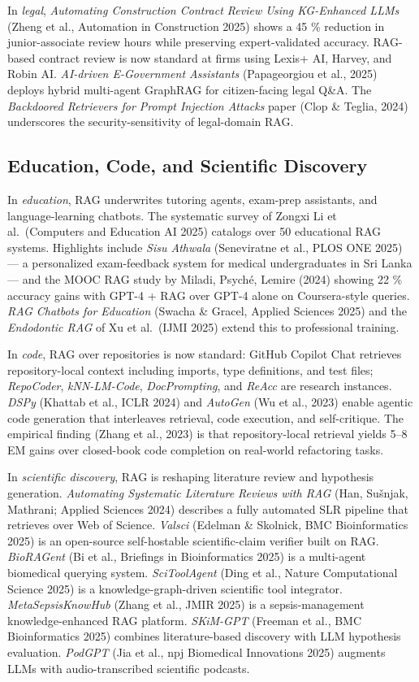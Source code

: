 In \emph{legal}, \emph{Automating Construction Contract Review Using KG-Enhanced LLMs} (Zheng et al., Automation in Construction 2025) shows a 45 \% reduction in junior-associate review hours while preserving expert-validated accuracy. RAG-based contract review is now standard at firms using Lexis+ AI, Harvey, and Robin AI. \emph{AI-driven E-Government Assistants} (Papageorgiou et al., 2025) deploys hybrid multi-agent GraphRAG for citizen-facing legal Q\&A. The \emph{Backdoored Retrievers for Prompt Injection Attacks} paper (Clop \& Teglia, 2024) underscores the security-sensitivity of legal-domain RAG.

\subsection{Education, Code, and Scientific Discovery}\label{education-code-and-scientific-discovery}

In \emph{education}, RAG underwrites tutoring agents, exam-prep assistants, and language-learning chatbots. The systematic survey of Zongxi Li et al.~(Computers and Education AI 2025) catalogs over 50 educational RAG systems. Highlights include \emph{Sisu Athwala} (Seneviratne et al., PLOS ONE 2025) --- a personalized exam-feedback system for medical undergraduates in Sri Lanka --- and the MOOC RAG study by Miladi, Psyché, Lemire (2024) showing 22 \% accuracy gains with GPT-4 + RAG over GPT-4 alone on Coursera-style queries. \emph{RAG Chatbots for Education} (Swacha \& Gracel, Applied Sciences 2025) and the \emph{Endodontic RAG} of Xu et al.~(IJMI 2025) extend this to professional training.

In \emph{code}, RAG over repositories is now standard: GitHub Copilot Chat retrieves repository-local context including imports, type definitions, and test files; \emph{RepoCoder}, \emph{kNN-LM-Code}, \emph{DocPrompting}, and \emph{ReAcc} are research instances. \emph{DSPy} (Khattab et al., ICLR 2024) and \emph{AutoGen} (Wu et al., 2023) enable agentic code generation that interleaves retrieval, code execution, and self-critique. The empirical finding (Zhang et al., 2023) is that repository-local retrieval yields 5--8 EM gains over closed-book code completion on real-world refactoring tasks.

In \emph{scientific discovery}, RAG is reshaping literature review and hypothesis generation. \emph{Automating Systematic Literature Reviews with RAG} (Han, Sušnjak, Mathrani; Applied Sciences 2024) describes a fully automated SLR pipeline that retrieves over Web of Science. \emph{Valsci} (Edelman \& Skolnick, BMC Bioinformatics 2025) is an open-source self-hostable scientific-claim verifier built on RAG. \emph{BioRAGent} (Bi et al., Briefings in Bioinformatics 2025) is a multi-agent biomedical querying system. \emph{SciToolAgent} (Ding et al., Nature Computational Science 2025) is a knowledge-graph-driven scientific tool integrator. \emph{MetaSepsisKnowHub} (Zhang et al., JMIR 2025) is a sepsis-management knowledge-enhanced RAG platform. \emph{SKiM-GPT} (Freeman et al., BMC Bioinformatics 2025) combines literature-based discovery with LLM hypothesis evaluation. \emph{PodGPT} (Jia et al., npj Biomedical Innovations 2025) augments LLMs with audio-transcribed scientific podcasts.

